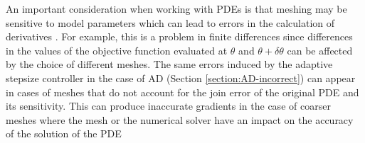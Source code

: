 An important consideration when working with PDEs is that meshing may be sensitive to model parameters which can lead to errors in the calculation of derivatives \cite{nadarajah2000comparison}. 
For example, this is a problem in finite differences since differences in the values of the objective function evaluated at $\theta$ and $\theta + \delta \theta$ can be affected by the choice of different meshes. 
The same errors induced by the adaptive stepsize controller in the case of AD (Section \ref{section:AD-incorrect}) can appear in cases of meshes that do not account for the join error of the original PDE and its sensitivity. 
This can produce inaccurate gradients in the case of coarser meshes where the mesh or the numerical solver have an impact on the accuracy of the solution of the PDE \cite{economon2017adjoint, KENWAY2019100542}

